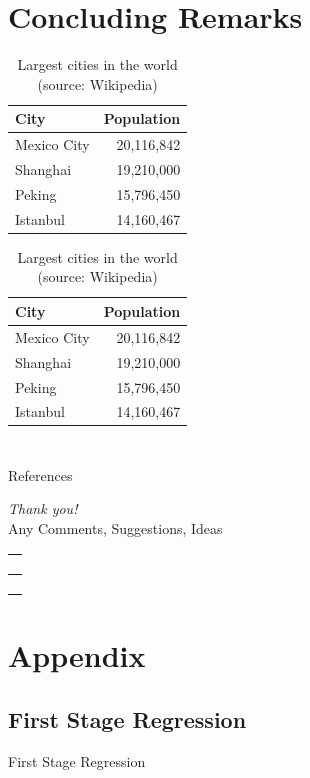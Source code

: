 \documentclass[
11pt,notheorems,compress,hyperref={pdfauthor=Maghfira Ramadhani}
]{beamer}
\begin{document}
\section{Concluding Remarks}
\begin{frame}
    \begin{table}
        \caption{Largest cities in the world (source: Wikipedia)}
        \begin{tabular}{@{} lr @{}}
          \toprule
          City & Population\\
          \midrule
          Mexico City & 20,116,842\\
          Shanghai & 19,210,000\\
          Peking & 15,796,450\\
          Istanbul & 14,160,467\\
          \bottomrule
        \end{tabular}
        \hspace*{1cm}
            \setlength\extrarowheight{3pt}
        \begin{tabular}{|lr|}
          \hline
          \rowcolor{primary}\color{white}City & \color{white}Population\\
          \hline
          Mexico City & 20,116,842\\
          Shanghai & 19,210,000\\
          Peking & 15,796,450\\
          Istanbul & 14,160,467\\
          \hline
        \end{tabular}
    \end{table}
\end{frame}

\section{}
\begin{frame}[allowframebreaks]{References}
    
    
\end{frame}

\begin{frame}{}
  \centering
  {\LARGE\emph{Thank you!}}\\
  \vspace{1cm}
  Any Comments, Suggestions, Ideas\\
  \href{mailto:\maghfira.ramadhani@gatech.edu}{\faEnvelope\ \  }\\
  \href{http://maghfiraer.github.io}{\faHome\ \  } \\
  \href{https://github.com/maghfiraer/ECON7023-Metrics-II/tree/main/Final_Project}{\faGithubSquare\ \  }
\end{frame}

\appendix
\section{Appendix}
\subsection{First Stage Regression}
\begin{frame}
    \begin{table}[h]
    \caption{First Stage Regression}
    \scalebox{0.6}{}    
    \end{table}
\end{frame}
\end{document}
